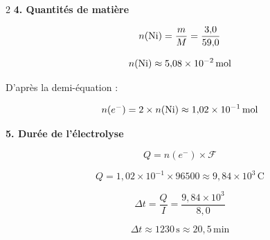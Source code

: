\documentclass[a4paper,11pt,fleqn]{scrartcl}
\begin{document}
\begin{multicols}{2}
\textbf{4. Quantités de matière}

\[
n(\ce{Ni}) = \frac{m}{M} = \frac{3{,}0}{59{,}0}
\]

\[
n(\ce{Ni}) \approx 5{,}08 \times 10^{-2}\,\text{mol}
\]

D’après la demi-équation :

\[
n(e^-) = 2 \times n(\ce{Ni}) \approx 1{,}02 \times 10^{-1}\,\text{mol}
\]

\textbf{5. Durée de l’électrolyse}

\[
Q = n(e^-) \times \mathcal{F}
\]

\[
Q = 1{,}02 \times 10^{-1} \times 96500 \approx 9{,}84 \times 10^{3}\,\text{C}
\]

\[
\Delta t = \frac{Q}{I} = \frac{9{,}84 \times 10^{3}}{8{,}0}
\]

\[
\Delta t \approx 1230\,\text{s} \approx 20{,}5\,\text{min}
\]

\end{multicols}
\end{document}
